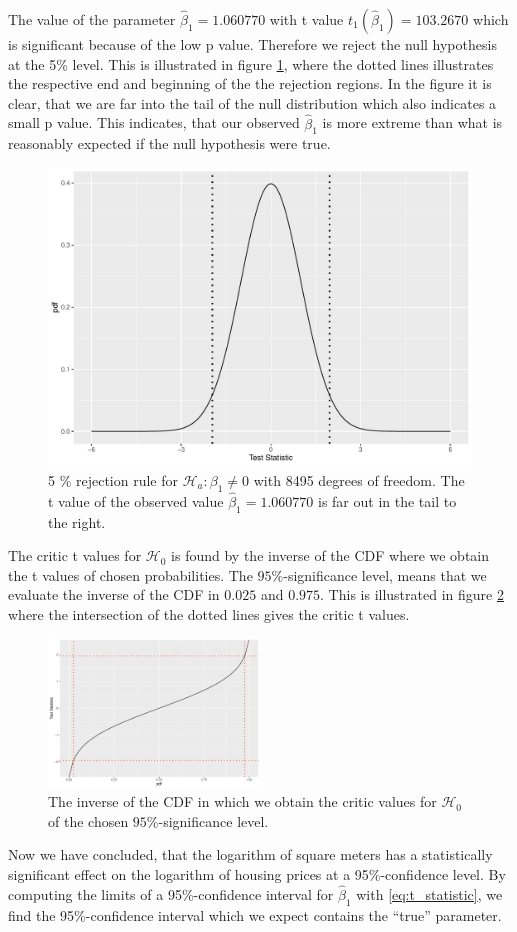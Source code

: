 \begin{example} 
The value of the parameter $\hat{\beta}_1=1.060770$ with t value $t_1(\hat{\beta}_1) = 103.2670$ which is significant because of the low p value. 
Therefore we reject the null hypothesis at the 5\% level. This is illustrated in figure \ref{fig:t_distributionplot1}, where the dotted lines illustrates the respective end and beginning of the the rejection regions.
In the figure it is clear, that we are far into the tail of the null distribution which also indicates a small p value. 
This indicates, that our observed $\hat{\beta}_1$ is more extreme than what is reasonably expected if the null hypothesis were true.
\begin{figure}[H]
    \centering
    \includegraphics[width = 0.6  \textwidth]{figures/Nanna/t_distribution123.pdf}
    \caption{5 \% rejection rule for $\mathcal{H}_a:\beta_1\neq0$ with 8495 degrees of freedom. The t value of the observed value $\hat{\beta}_1=1.060770$ is far out in the tail to the right.}
    \label{fig:t_distributionplot1}
\end{figure}
The critic t values for $\mathcal{H}_0$ is found by the inverse of the CDF where we obtain the t values of chosen probabilities. 
The $95\%$-significance level, means that we evaluate the inverse of the CDF in $0.025$ and $0.975$. 
This is illustrated in figure \ref{fig:CDF_inverse} where the intersection of the dotted lines gives the critic t values.
\begin{figure}[H]
    \centering
    \includegraphics[width = 0.5\textwidth]{figures/Nanna/Inverse_CDF.pdf}
    \caption{The inverse of the CDF in which we obtain the critic values for $\mathcal{H}_0$ of the chosen $95\%$-significance level.}
    \label{fig:CDF_inverse}
\end{figure}
Now we have concluded, that the logarithm of square meters has a statistically significant effect on the logarithm of housing prices at a 95\%-confidence level. 
By computing the limits of a 95\%-confidence interval for $\hat{\beta}_1$ with \eqref{eq:t_statistic}, we find the 95\%-confidence interval which we expect contains the ``true'' parameter.


\end{example}

